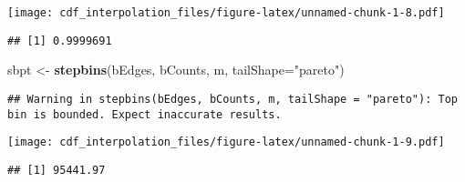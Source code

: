 \documentclass[]{article}
\newenvironment{Shaded}{\begin{snugshade}}{\end{snugshade}}
\newcommand{\ControlFlowTok}[1]{\textcolor[rgb]{0.13,0.29,0.53}{\textbf{#1}}}
\newcommand{\DataTypeTok}[1]{\textcolor[rgb]{0.13,0.29,0.53}{#1}}
\newcommand{\DecValTok}[1]{\textcolor[rgb]{0.00,0.00,0.81}{#1}}
\newcommand{\KeywordTok}[1]{\textcolor[rgb]{0.13,0.29,0.53}{\textbf{#1}}}
\newcommand{\NormalTok}[1]{#1}
\newcommand{\OperatorTok}[1]{\textcolor[rgb]{0.81,0.36,0.00}{\textbf{#1}}}
\newcommand{\OtherTok}[1]{\textcolor[rgb]{0.56,0.35,0.01}{#1}}
\newcommand{\StringTok}[1]{\textcolor[rgb]{0.31,0.60,0.02}{#1}}
\begin{document}
\texttt{[image: cdf\_interpolation\_files/figure-latex/unnamed-chunk-1-8.pdf]}

\begin{Shaded}
\end{Shaded}

\begin{verbatim}
## [1] 0.9999691
\end{verbatim}

\begin{Shaded}
\begin{Highlighting}[]
\NormalTok{sbpt <-}\StringTok{ }\KeywordTok{stepbins}\NormalTok{(bEdges, bCounts, m, }\DataTypeTok{tailShape=}\StringTok{"pareto"}\NormalTok{)}
\end{Highlighting}
\end{Shaded}

\begin{verbatim}
## Warning in stepbins(bEdges, bCounts, m, tailShape = "pareto"): Top bin is bounded. Expect inaccurate results.
\end{verbatim}

\begin{Shaded}
\end{Shaded}

\texttt{[image: cdf\_interpolation\_files/figure-latex/unnamed-chunk-1-9.pdf]}

\begin{Shaded}
\end{Shaded}

\begin{verbatim}
## [1] 95441.97
\end{verbatim}
\end{document}
